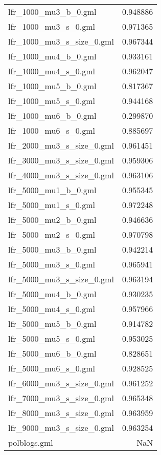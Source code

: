 \begin{tabular}{lr}
lfr\_1000\_mu3\_b\_0.gml       &                      0.948886 \\
lfr\_1000\_mu3\_s\_0.gml       &                      0.971365 \\
lfr\_1000\_mu3\_s\_size\_0.gml  &                      0.967344 \\
lfr\_1000\_mu4\_b\_0.gml       &                      0.933161 \\
lfr\_1000\_mu4\_s\_0.gml       &                      0.962047 \\
lfr\_1000\_mu5\_b\_0.gml       &                      0.817367 \\
lfr\_1000\_mu5\_s\_0.gml       &                      0.944168 \\
lfr\_1000\_mu6\_b\_0.gml       &                      0.299870 \\
lfr\_1000\_mu6\_s\_0.gml       &                      0.885697 \\
lfr\_2000\_mu3\_s\_size\_0.gml  &                      0.961451 \\
lfr\_3000\_mu3\_s\_size\_0.gml  &                      0.959306 \\
lfr\_4000\_mu3\_s\_size\_0.gml  &                      0.963106 \\
lfr\_5000\_mu1\_b\_0.gml       &                      0.955345 \\
lfr\_5000\_mu1\_s\_0.gml       &                      0.972248 \\
lfr\_5000\_mu2\_b\_0.gml       &                      0.946636 \\
lfr\_5000\_mu2\_s\_0.gml       &                      0.970798 \\
lfr\_5000\_mu3\_b\_0.gml       &                      0.942214 \\
lfr\_5000\_mu3\_s\_0.gml       &                      0.965941 \\
lfr\_5000\_mu3\_s\_size\_0.gml  &                      0.963194 \\
lfr\_5000\_mu4\_b\_0.gml       &                      0.930235 \\
lfr\_5000\_mu4\_s\_0.gml       &                      0.957966 \\
lfr\_5000\_mu5\_b\_0.gml       &                      0.914782 \\
lfr\_5000\_mu5\_s\_0.gml       &                      0.953025 \\
lfr\_5000\_mu6\_b\_0.gml       &                      0.828651 \\
lfr\_5000\_mu6\_s\_0.gml       &                      0.928525 \\
lfr\_6000\_mu3\_s\_size\_0.gml  &                      0.961252 \\
lfr\_7000\_mu3\_s\_size\_0.gml  &                      0.965348 \\
lfr\_8000\_mu3\_s\_size\_0.gml  &                      0.963959 \\
lfr\_9000\_mu3\_s\_size\_0.gml  &                      0.963254 \\
polblogs.gml               &                           NaN \\
\bottomrule
\end{tabular}
